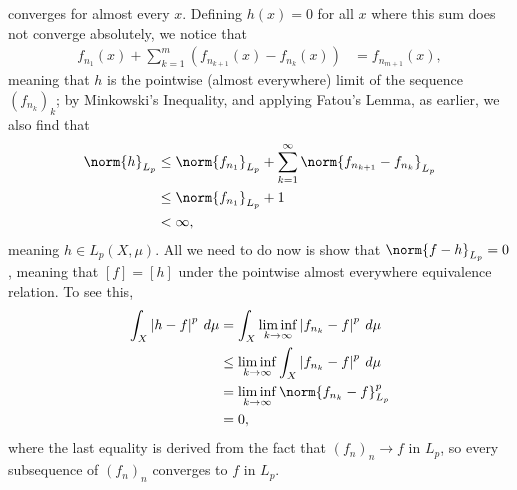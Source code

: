 \documentclass[10pt]{mypackage}
\begin{document}
\begin{enumerate}[(i)]
    converges for almost every $x$. Defining $h(x) = 0$ for all $x$ where this sum does not converge absolutely, we notice that
    \begin{align*}
      f_{n_{1}}(x) + \sum_{k=1}^{m}\left( f_{n_{k+1}}(x) - f_{n_{k}}(x) \right) &= f_{n_{m+1}}(x),
    \end{align*}
    meaning that $h$ is the pointwise (almost everywhere) limit of the sequence $\left( f_{n_{k}} \right)_{k}$; by Minkowski's Inequality, and applying Fatou's Lemma, as earlier, we also find that
    \begin{align*}
      \norm{h}_{L_p} &\leq \norm{f_{n_1}}_{L_p} + \sum_{k=1}^{\infty}\norm{f_{n_{k+1}}-f_{n_{k}}}_{L_p}\\
                     &\leq \norm{f_{n_{1}}}_{L_p} + 1\\
                     &< \infty,
    \end{align*}
    meaning $h\in L_{p}\left( X,\mu \right)$. All we need to do now is show that $\norm{f-h}_{L_p} = 0$, meaning that $\left[ f \right] = \left[ h \right]$ under the pointwise almost everywhere equivalence relation. To see this, 
    \begin{align*}
      \int_{X}^{} \left\vert h-f \right\vert^{p}\:d\mu &= \int_{X}^{} \liminf_{k\rightarrow\infty} \left\vert f_{n_{k}} - f \right\vert^{p}\:d\mu\\
                                                       &\leq \liminf_{k\rightarrow\infty} \int_{X}^{} \left\vert f_{n_{k}} - f \right\vert^{p}\:d\mu\\
                                                       &= \liminf_{k\rightarrow\infty} \norm{f_{n_{k}} - f}_{L_p}^{p}\\
                                                       &= 0,
    \end{align*}
    where the last equality is derived from the fact that $\left( f_{n} \right)_n\rightarrow f$ in $L_p$, so every subsequence of $\left( f_{n} \right)_n$ converges to $f$ in $L_p$.
\end{enumerate}
\end{document}
